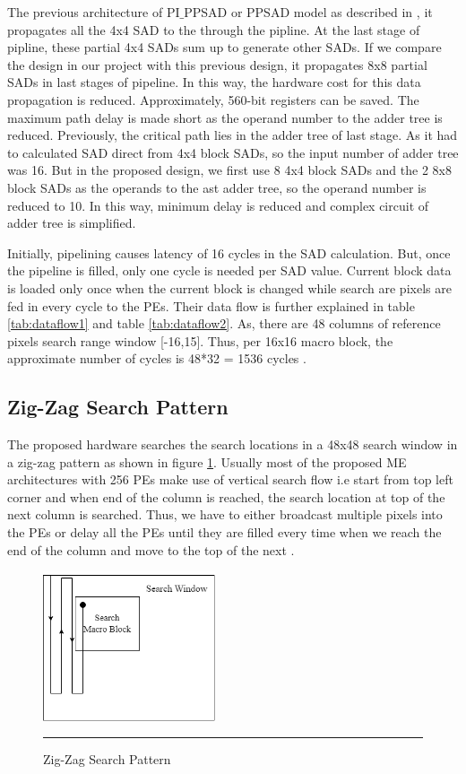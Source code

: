 The previous architecture of PI$\_$PPSAD or PPSAD model as described in \cite{huang2003hardware}, it propagates all the 4x4 SAD to the through the pipline. At the last stage of pipline, these partial 4x4 SADs sum up to generate other SADs. If we compare the design in our project with this previous design, it propagates 8x8 partial SADs in last stages of pipeline. In this way, the hardware cost for this data propagation is reduced. Approximately, 560-bit registers can be saved. The maximum path delay is made short as the operand number to the adder tree is reduced. Previously, the critical path lies in the adder tree of last stage. As it had to calculated SAD direct from 4x4 block SADs, so the input number of adder tree was 16. But in the proposed design, we first use 8 4x4 block SADs and the 2 8x8 block SADs as the operands to the ast adder tree, so the operand number is reduced to 10. In this way, minimum delay is reduced and complex circuit of adder tree is simplified.

Initially, pipelining causes latency of 16 cycles in the SAD calculation. But, once the pipeline is filled, only one cycle is needed per SAD value. Current block data is loaded only once when the current block is changed while search are pixels are fed in every cycle to the PEs. Their data flow is further explained in table \ref{tab:dataflow1} and table \ref{tab:dataflow2}. As, there are 48 columns of reference pixels search range window [-16,15]. Thus, per 16x16 macro block, the approximate number of cycles is 48*32 = 1536 cycles \cite{lin2008parallel}.

\subsection{Zig-Zag Search Pattern}

The proposed hardware searches the search locations in a 48x48 search window in a zig-zag pattern as shown in figure \ref{fig:zigzag}. Usually most of the proposed ME architectures with 256 PEs make use of vertical search flow i.e start from top left corner and when end of the column is reached, the search location at top of the next column is searched. Thus, 
we have to either broadcast multiple pixels into the PEs or delay all the PEs until they are filled every time when we reach the end of the column and move to the top of the next \cite{hardware_architecture_design}.

\begin{figure}[H]
	\centering
	\includegraphics[width = 2in]{./Figures/zigzag.png}
	\rule{35em}{0.5pt}
	\caption{Zig-Zag Search Pattern}
	\label{fig:zigzag}
\end{figure}

